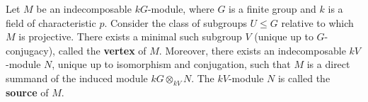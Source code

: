 \begin{definition}
\label{def:vertex-and-source}
Let $M$ be an indecomposable $kG$-module, where $G$ is a finite group and $k$ is a field of characteristic $p$. Consider the class of subgroups $U \leq G$ relative to which $M$ is projective. There exists a minimal such subgroup $V$ (unique up to $G$-conjugacy), called the \textbf{vertex} of $M$. Moreover, there exists an indecomposable $kV$-module $N$, unique up to isomorphism and conjugation, such that $M$ is a direct summand of the induced module $kG \otimes_{kV} N$. The $kV$-module $N$ is called the \textbf{source} of $M$.
\end{definition}
